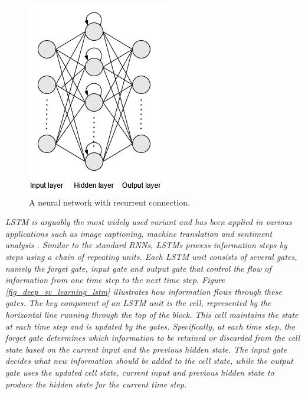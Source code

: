 \documentclass[preprint,12pt]{elsarticle}
\begin{document}
\begin{figure}[h!]
    \centering
    \includegraphics[scale=0.6]{fig_deep_sv_learning_rnn.png}
    \caption{A neural network with recurrent connection.}
    \label{fig_deep_sv_learning_rnn}
\end{figure}

\emph{LSTM is arguably the most widely used variant and has been applied in various applications such as image captioning, machine translation and sentiment analysis \citep{van_houdt_review_2020}. Similar to the standard RNNs, LSTMs process information steps by steps using a chain of repeating units. Each LSTM unit consists of several gates, namely the forget gate, input gate and output gate that control the flow of information from one time step to the next time step. Figure \ref{fig_deep_sv_learning_lstm} illustrates how information flows through these gates. The key component of an LSTM unit is the cell, represented by the horizontal line running through the top of the block. This cell maintains the state at each time step and is updated by the gates. Specifically, at each time step, the forget gate determines which information to be retained or discarded from the cell state based on the current input and the previous hidden state. The input gate decides what new information should be added to the cell state, while the output gate uses the updated cell state, current input and previous hidden state to produce the hidden state for the current time step.}
\end{document}
